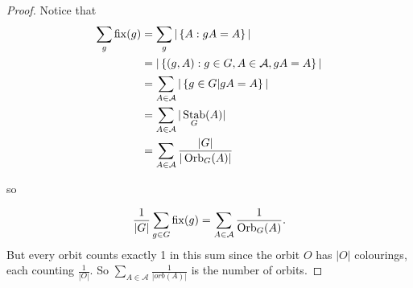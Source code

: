 \documentclass{article}
\theoremstyle{definition} \newtheorem*{definition}{Definition}
\DeclareMathOperator{\Orb}{Orb} \DeclareMathOperator{\Stab}{Stab}
\DeclareMathOperator{\fix}{fix} \DeclareMathOperator{\ord}{\text{ord}}
\begin{document}
   \begin{proof} Notice that \begin{align*} \sum_g \fix(g) &= \sum_g |\left\{ A
       : gA = A \right\}| \\ &= |\left\{ (g,A) : g \in G, A \in
         \mathcal{A},gA=A \right\}|\\ &= \sum_{A \in \mathcal{A}}|\left\{ g \in
         G | gA = A \right\}|\\ &= \sum_{A \in \A} |\Stab_G(A)|\\ &= \sum_{A
         \in \A} \frac{|G|}{|\Orb_G(A)|} \end{align*}

so

\begin{align*} \frac{1}{|G|}\sum_{g \in G} \fix(g) = \sum_{A \in \A}
  \frac{1}{\Orb_G(A)}.  \end{align*} But every orbit counts exactly 1 in this
sum since the orbit $O$ has $|O|$ colourings, each counting $\frac{1}{|O|}$. So
$\sum_{A \in \mathcal{A}}\frac{1}{|orb(A)|}$ is the number of orbits.
\end{proof}
\end{document}
